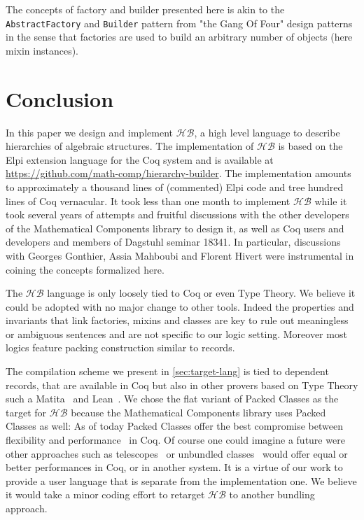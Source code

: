 \documentclass[a4paper,UKenglish,cleveref, autoref]{lipics-v2019}
\newcommand{\HB}{\ensuremath{\mathcal{HB}}}
\newcommand{\mixin}{mixin}
\newcommand{\mixins}{mixins}
\newcommand{\factory}{factory}
\newcommand{\factories}{factories}
\newcommand{\builder}{builder}
\newcommand{\classes}{classes}
\theoremstyle{implem}
\theoremstyle{implem}
\theoremstyle{command}
\theoremstyle{commands}
\begin{document}
{{The concepts of \factory{} and \builder{} presented here is akin to the
\verb-AbstractFactory- and \verb-Builder- pattern from "the Gang Of Four" design
patterns~\cite{gamma1995design} in the sense that \factories{} are used
to build an arbitrary number of objects (here \mixin{} instances).

\section{Conclusion}
In this paper we design and implement \HB{}, a high level language to describe
hierarchies of algebraic structures. The implementation of \HB{} is
based on the Elpi extension language for the Coq system and is available
at \url{https://github.com/math-comp/hierarchy-builder}.
The implementation amounts to approximately a thousand lines of (commented)
Elpi code and tree hundred lines of Coq vernacular. It took less than one month
to implement \HB{} while it took several years of attempts and fruitful
discussions with the other developers of the Mathematical Components library
to design it, as well as Coq users and developers and members of Dagstuhl seminar 18341.
In particular, discussions with Georges Gonthier, Assia Mahboubi and
Florent Hivert were instrumental in coining the concepts formalized here.

The \HB{} language is only loosely tied to Coq or even Type Theory.
We believe it could be adopted with no major change to other tools. Indeed the
properties and invariants that link \factories{}, \mixins{} and \classes{}
are key to rule out meaningless or ambiguous sentences and are not
specific to our logic setting. Moreover
most logics feature packing construction similar to records.

The compilation scheme we present in \autoref{sec:target-lang} is tied to dependent records,
that are available in Coq but also
in other provers based on Type Theory such a Matita~\cite{DBLP:conf/cade/AspertiRCT11}
and Lean~\cite{DBLP:conf/cade/MouraKADR15}.
We chose the flat variant of Packed Classes as the target for \HB{} because the
Mathematical Components library uses Packed Classes as well: As of today
Packed Classes offer the best compromise between flexibility and
performance~\cite[Section 8]{DBLP:conf/itp/MahboubiT13} in Coq.
Of course one could imagine a future were other approaches such as
telescopes~\cite{telescopes} or unbundled
classes~\cite{mathclasses} would offer equal or better performances in Coq, or in
another system.
It is a virtue of our work to provide a user language that is separate
from the implementation one. We believe it would take a minor coding effort to
retarget \HB{} to another bundling approach.

}}
\end{document}
